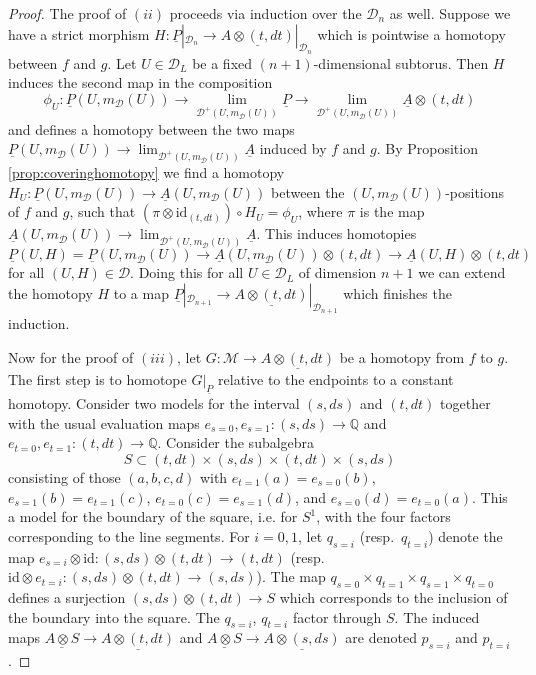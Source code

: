 \documentclass[12pt,a4paper]{article}
\newcommand{\id}{\mathrm{id}}
\theoremstyle{definition}
\begin{document}
\begin{proof}
The proof of $(ii)$ proceeds via induction over the $\mathcal{D}_n$ as well. Suppose we have a strict morphism $H\colon\underline{P}|_{\mathcal{D}_n}\rightarrow \underline{A\otimes (t,dt)}|_{\mathcal{D}_n}$ which is pointwise a homotopy between $f$ and $g$.
Let $U\in\mathcal{D}_L$ be a fixed $(n+1)$-dimensional subtorus. Then $H$ induces the second map in the composition
\[\phi_U\colon\underline{P}(U,m_\mathcal{D}(U))\rightarrow \lim_{\mathcal{D}^+(U,m_\mathcal{D}(U))} \underline{P}\rightarrow\lim_{\mathcal{D}^+(U,m_\mathcal{D}(U))} \underline{A}\otimes(t,dt)\]
and defines a homotopy between the two maps $\underline{P}(U,m_\mathcal{D}(U))\rightarrow \lim_{\mathcal{D}^+(U,m_\mathcal{D}(U))} \underline{A}$ induced by $f$ and $g$.
By Proposition \ref{prop:coveringhomotopy} we find a homotopy $H_{U}\colon \underline{P}(U,m_\mathcal{D}(U))\rightarrow \underline{A}(U,m_\mathcal{D}(U))$ between the $(U,m_\mathcal{D}(U))$-positions of $f$ and $g$, such that $(\pi\otimes \id_{(t,dt)})\circ H_U=\phi_U$, where $\pi$ is the map $\underline{A}(U,m_\mathcal{D}(U))\rightarrow \lim_{\mathcal{D}^+(U,m_\mathcal{D}(U))} \underline{A}$. This induces homotopies $\underline{P}(U,H)=\underline{P}(U,m_\mathcal{D}(U))\rightarrow \underline{A}(U,m_\mathcal{D}(U))\otimes (t,dt)\rightarrow \underline{A}(U,H)\otimes (t,dt)$ for all $(U,H)\in\mathcal{D}$. Doing this for all $U\in\mathcal{D}_L$ of dimension $n+1$ we can extend the homotopy $H$ to a map $\underline{P}|_{\mathcal{D}_{n+1}}\rightarrow \underline{A\otimes (t,dt)}|_{\mathcal{D}_{n+1}}$ which finishes the induction.

Now for the proof of $(iii)$, let $G\colon \mathcal{M}\rightarrow \underline{A\otimes (t,dt)}$ be a homotopy from $f$ to $g$. The first step is to homotope $G|_{\underline{P}}$ relative to the endpoints to a constant homotopy. Consider two models for the interval $(s,ds)$ and $(t,dt)$ together with the usual evaluation maps $e_{s=0},e_{s=1}\colon (s,ds)\rightarrow \mathbb{Q}$ and $e_{t=0},e_{t=1}\colon (t,dt)\rightarrow \mathbb{Q}$. Consider the subalgebra \[S\subset (t,dt)\times (s,ds)\times (t,dt)\times (s,ds)\]
consisting of those $(a,b,c,d)$ with $e_{t=1}(a)=e_{s=0}(b)$, $e_{s=1}(b)=e_{t=1}(c)$, $e_{t=0}(c)=e_{s=1}(d)$, and $e_{s=0}(d)=e_{t=0}(a)$. This a model for the boundary of the square, i.e. for $S^1$, with the four factors corresponding to the line segments. For $i=0,1$, let $q_{s=i}$ (resp.\ $q_{t=i}$) denote the map $e_{s=i}\otimes \id\colon (s,ds)\otimes (t,dt)\rightarrow (t,dt)$ (resp.\ $\id\otimes e_{t=i}\colon (s,ds)\otimes (t,dt)\rightarrow (s,ds)$). The map $q_{s=0}\times q_{t=1}\times q_{s=1}\times q_{t=0}$ defines a surjection $(s,ds)\otimes (t,dt)\rightarrow S$ which corresponds to the inclusion of the boundary into the square. The $q_{s=i}$, $q_{t=i}$ factor through $S$. The induced maps $\underline{A\otimes S}\rightarrow\underline{A\otimes (t,dt)}$ and $\underline{A\otimes S}\rightarrow\underline{A\otimes (s,ds)}$ are denoted ${p}_{s=i}$ and ${p}_{t=i}$.


\end{proof}
\end{document}
